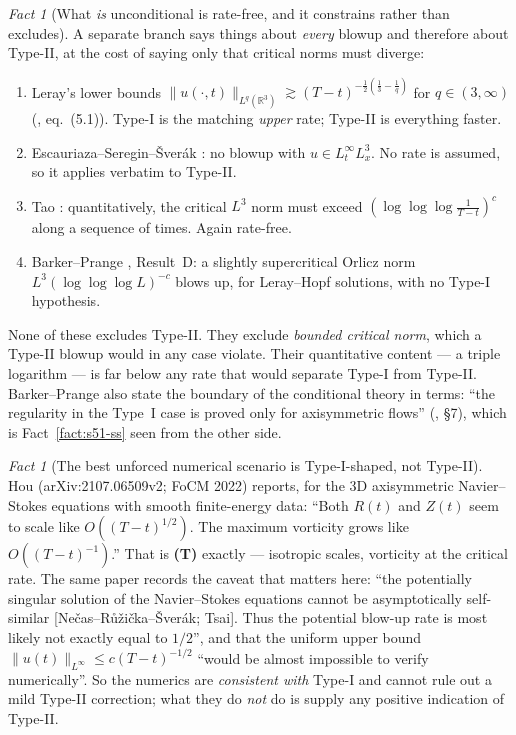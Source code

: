 \documentclass[11pt]{article}
\theoremstyle{definition}
\theoremstyle{remark}
\newtheorem{fact}[theorem]{Fact}
\newcommand{\R}{\mathbb{R}}
\begin{document}
\begin{fact}[What \emph{is} unconditional is rate-free, and it constrains
  rather than excludes]\label{fact:wpt1-ratefree}
  A separate branch says things about \emph{every} blowup and therefore about
  Type-II, at the cost of saying only that critical norms must diverge:
  \begin{enumerate}[label=(\alph*)]
    \item Leray's lower bounds $\|u(\cdot,t)\|_{L^q(\R^3)}\gtrsim
      (T-t)^{-\frac12(\frac13-\frac1q)}$ for $q\in(3,\infty)$
      (\cite{BarkerPrange2023}, eq.~(5.1)). Type-I is the matching
      \emph{upper} rate; Type-II is everything faster.
    \item Escauriaza--Seregin--\v{S}ver\'ak
      \cite{EscauriazaSereginSverak2003}: no blowup with
      $u\in L^\infty_tL^3_x$. No rate is assumed, so it applies verbatim to
      Type-II.
    \item Tao \cite{Tao2019}: quantitatively, the critical $L^3$ norm must
      exceed $(\log\log\log\frac1{T-t})^{c}$ along a sequence of times. Again
      rate-free.
    \item Barker--Prange \cite{BarkerPrange2023}, Result~D: a slightly
      supercritical Orlicz norm $L^3(\log\log\log L)^{-c}$ blows up, for
      Leray--Hopf solutions, with no Type-I hypothesis.
  \end{enumerate}
  None of these excludes Type-II. They exclude \emph{bounded critical norm},
  which a Type-II blowup would in any case violate. Their quantitative
  content --- a triple logarithm --- is far below any rate that would
  separate Type-I from Type-II.
  Barker--Prange also state the boundary of the conditional theory in terms:
  ``the regularity in the Type~I case is proved only for axisymmetric flows''
  (\cite{BarkerPrange2023}, \S7), which is
  Fact~\ref{fact:s51-ss} seen from the other side.
\end{fact}

\begin{fact}[The best unforced numerical scenario is Type-I-shaped, not
  Type-II]\label{fact:wpt1-hou}
  Hou \cite{Hou2022} (arXiv:2107.06509v2; FoCM 2022) reports, for the 3D
  axisymmetric Navier--Stokes equations with smooth finite-energy data:
  ``Both $R(t)$ and $Z(t)$ seem to scale like $O((T-t)^{1/2})$. The maximum
  vorticity grows like $O((T-t)^{-1})$.'' That is \textbf{(T)} exactly ---
  isotropic scales, vorticity at the critical rate. The same paper records
  the caveat that matters here: ``the potentially singular solution of the
  Navier--Stokes equations cannot be asymptotically self-similar
  [Ne\v{c}as--R\r{u}\v{z}i\v{c}ka--\v{S}ver\'ak; Tsai]. Thus the potential
  blow-up rate is most likely not exactly equal to $1/2$'', and that the
  uniform upper bound $\|u(t)\|_{L^\infty}\leq c(T-t)^{-1/2}$ ``would be
  almost impossible to verify numerically''. So the numerics are
  \emph{consistent with} Type-I and cannot rule out a mild Type-II
  correction; what they do \emph{not} do is supply any positive indication of
  Type-II.
\end{fact}
\end{document}

